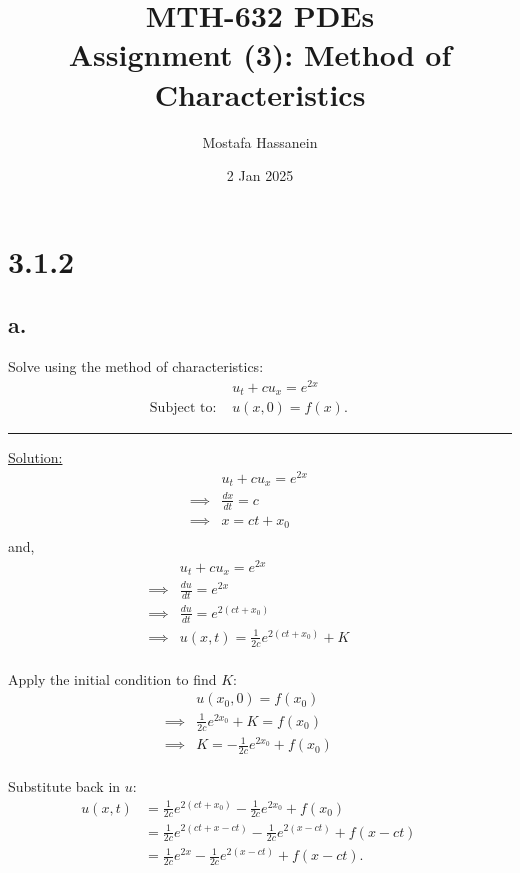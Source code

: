 \documentclass{article}
\author{Mostafa Hassanein}
\title{
  MTH-632 PDEs \\
  Assignment (3): Method of Characteristics}
\date{2 Jan 2025}
\begin{document}
\maketitle
\newpage
 
\section*{3.1.2}
\subsection*{a.}
Solve using the method of characteristics:
\begin{align*}
  &u_t + c u_x = e^{2x} &&\\
  \text{Subject to: }& u(x,0) = f(x).
\end{align*}

\begin{center}
  \noindent\rule{8cm}{0.4pt}
\end{center}

\underline{Solution:}
\begin{align*}
  &u_t + c u_x = e^{2x} &&\\
  \implies& \frac{dx}{dt} = c &&\\
  \implies& x = ct + x_0 &&\\
\end{align*}
and,
\begin{align*}
  &u_t + c u_x = e^{2x} &&\\
  \implies& \frac{du}{dt} = e^{2x} &&\\
  \implies& \frac{du}{dt} = e^{2(ct+x_0)} &&\\
  \implies& u(x,t) = \frac{1}{2c} e^{2(ct+x_0)} + K &&\\
\end{align*}

Apply the initial condition to find $K$:
\begin{align*}
  &u(x_0, 0) = f(x_0) &&\\
  \implies& \frac{1}{2c} e^{2x_0} + K = f(x_0) &&\\
  \implies& K = - \frac{1}{2c} e^{2x_0} + f(x_0) &&\\
\end{align*}

Substitute back in $u$:
\begin{align*}
  u(x,t) &= \frac{1}{2c} e^{2(ct+x_0)} - \frac{1}{2c} e^{2x_0} + f(x_0) &&\\
  &= \frac{1}{2c} e^{2(ct+x-ct)} - \frac{1}{2c} e^{2(x-ct)} + f(x-ct) &&\\
  &= \frac{1}{2c} e^{2x} - \frac{1}{2c} e^{2(x-ct)} + f(x-ct).
\end{align*}
\end{document}
